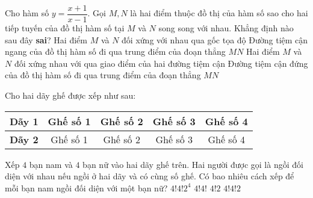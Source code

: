 \begin{ex}%
	Cho hàm số $y=\dfrac{x+1}{x-1}$. Gọi $M,N$ là hai điểm thuộc đồ thị của hàm số sao cho hai tiếp tuyến của đồ thị hàm số tại $M$ và $N$ song song với nhau. Khẳng định nào sau đây \textbf{sai}?	
	\choice
	{\True Hai điểm $M$ và $N$ đối xứng với nhau qua gốc tọa độ}
	{Đường tiệm cận ngang của đồ thị hàm số đi qua trung điểm của đoạn thẳng $MN$}
	{Hai điểm $M$ và $N$ đối xứng nhau với qua giao điểm của hai đường tiệm cận }
	{Đường tiệm cận đứng của đồ thị hàm số đi qua trung điểm của đoạn thẳng $MN$}
\end{ex}
\begin{ex}%
	Cho hai dãy ghế được xếp như sau:
	\begin{center}
	\begin{tabular}{|c|c|c|c|c|}
	\hline
	\textbf{Dãy 1} & Ghế số 1 & Ghế số 2 & Ghế số 3 & Ghế số 4\\ \hline
	\textbf{Dãy 2} & Ghế số 1 & Ghế số 2 & Ghế số 3 & Ghế số 4\\	\hline
	\end{tabular}
	\end{center}
	Xếp $4$ bạn nam và $4$ bạn nữ vào hai dãy ghế trên. Hai người được gọi là ngồi đối diện với nhau nếu ngồi ở hai dãy và có cùng số ghế. Có bao nhiêu cách xếp để mỗi bạn nam ngồi đối diện với một bạn nữ?
	\choice
	{\True $4!4!2^4$}
	{$4!4!$}
	{$4!2$}
	{$4!4!2$}
\end{ex}
